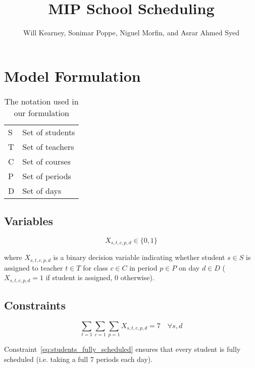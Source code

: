 \documentclass[12pt]{article}
\title{MIP School Scheduling}
\author{Will Kearney, Sonimar Poppe, Niguel Morfin, and Asrar Ahmed Syed}
\begin{document}
\maketitle

\section{Model Formulation}

\begin{table}[]
\centering
\caption{The notation used in our formulation}
\label{notationl}
\begin{tabular}{ll}
\hline
S & Set of students \\
T & Set of teachers \\
C & Set of courses  \\
P & Set of periods  \\
D & Set of days    \\ \hline
\end{tabular}
\end{table}

\subsection{Variables}

\begin{equation}
	X_{s,t,c,p,d} \in \{0,1\}
\end{equation}

where $X_{s,t,c,p,d}$ is a binary decision variable indicating whether student $s \in S$ is assigned to teacher $t \in T$ for class $c \in C$ in period $p \in P$ on day $d \in D$ ($X_{s,t,c,p,d}=1$ if student is assigned, 0 otherwise).


\subsection{Constraints}

\begin{equation} \label{eq:students_fully_scheduled}
	\displaystyle\sum_{t=1}\sum_{c=1}\sum_{p=1} X_{s,t,c,p,d}=7 \quad \forall s,d
\end{equation}

Constraint~\ref{eq:students_fully_scheduled} ensures that every student is fully scheduled (i.e. taking a full 7 periods each day).
\end{document}
